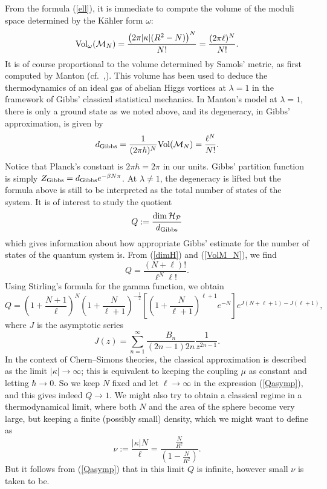 \documentclass[a4paper,11pt]{article}
\begin{document}
From the formula (\ref{ell}), it is immediate to compute the
volume of the moduli space determined by the K\"ahler form $\omega$:
\[
{\rm Vol}_{\omega}({\cal M}_{N})=
\frac{\left(2\pi|\kappa|(R^{2}-N) \right)^{N}}{N!}
=\frac{(2\pi \ell)^{N}}{N!}.
\]
It is of course proportional to the volume determined by Samols'
metric, as first computed by Manton (cf.~\cite{Msmv},\cite{MNvvms}).
This volume has been used to deduce the thermodynamics of an
ideal gas of abelian Higgs vortices at $\lambda=1$ in the framework 
of Gibbs' classical statistical mechanics. In Manton's model at $\lambda=1$, 
there is only a ground state as we noted above, and its degeneracy, in
Gibbs' approximation, is given by
\begin{equation}\label{VolM_N}
d_{\rm Gibbs}=\frac{1}{(2\pi\hbar)^{N}}{\rm Vol}({\cal M}_{N})
=\frac{\ell^{N}}{N!}.
\end{equation}
Notice that Planck's constant is $2\pi \hbar=2\pi$ in our units.
Gibbs' partition function is simply $Z_{\rm Gibbs}=
d_{\rm Gibbs}e^{-\beta N \pi}$.
At $\lambda\ne 1$, the degeneracy is lifted but the formula above is
still to be interpreted as the total number of states of the system.
It is of interest to study the quotient
\[
Q:=\frac{\dim {\cal H}_{\cal P}}
{d_{\rm Gibbs}}
\]
which gives information about how appropriate Gibbs' estimate for the
number of states of the quantum system is. 
From (\ref{dimH}) and (\ref{VolM_N}), we find
\[
Q=\frac{(N+\ell)!}{\ell^{N}\ell!}.
\]
Using Stirling's formula for the gamma function, we obtain
\begin{equation} \label{Qasymp}
Q=\left(1+\frac{N+1}{\ell} \right)^{N}
\left(1+\frac{N}{\ell +1}\right)^{-\frac{1}{2}}
\left[\left(1+\frac{N}{\ell+1}\right)^{\ell+1}e^{-N}\right]
e^{J(N+\ell+1)-J(\ell+1)},
\end{equation}
where $J$ is the asymptotic series
\[
J(z)=\sum_{n=1}^{\infty}\frac{B_{n}}{(2n-1)2n}\frac{1}{z^{2n-1}}.
\]
In the context of Chern--Simons theories, the classical approximation
is described as the limit $|\kappa|\rightarrow \infty$; this 
is equivalent to keeping the coupling $\mu$ as constant and letting
$\hbar\rightarrow 0$. So we keep $N$ fixed and let 
$\ell \rightarrow \infty$ in the expression
(\ref{Qasymp}), and this gives indeed $Q\rightarrow 1$.
We might also try to obtain a classical regime in a thermodynamical
limit, where both $N$ and the area of the sphere become very large,
but keeping a finite (possibly small) density, which we might want
to define as
\[
\nu:=\frac{|\kappa| N}{\ell}=
\frac{\frac{N}{R^{2}}}{\left(1-\frac{N}{R^{2}} \right)}.
\]
But it follows from (\ref{Qasymp}) that in this limit $Q$ is infinite,
however small $\nu$ is taken to be.
\end{document}
